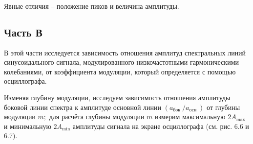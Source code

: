 \\
\
\\
\

Явные отличия -- положение пиков и величина амплитуды. 

\subsection{Часть В}

В этой части исследуется зависимость отношения амплитуд спектральных линий синусоидального сигнала, модулированного низкочастотными гармоническими колебаниями, от коэффициента модуляции, который определяется с помощью осциллографа.

Изменяя глубину модуляции, исследуем зависимость отношения амплитуды боковой линии спектра к амплитуде основной линии $\left(a_{\text {бок }} / a_{\text {осн }}\right)$ от глубины модуляции $m ;$ для расчёта глубины модуляции $m$ измерим максимальную $2 A_{\max }$ и минимальную $2 A_{\min }$ амплитуды сигнала на экране осциллографа (см. рис. 6.6 и 6.7). 

\\
\
\\
\

